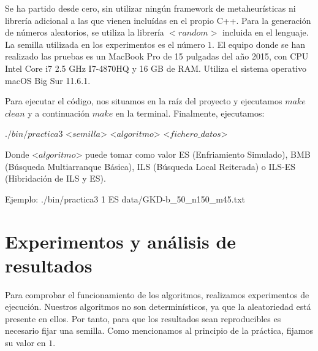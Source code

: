 
Se ha partido desde cero, sin utilizar ningún framework de metaheurísticas ni librería adicional a las que vienen incluídas en el propio C++. Para la generación de números aleatorios, se utiliza la librería $<random>$ incluida en el lenguaje. La semilla utilizada en los experimentos es el número $1$. El equipo donde se han realizado las pruebas es un MacBook Pro de 15 pulgadas del año 2015, con CPU Intel Core i7 2.5 GHz I7-4870HQ y 16 GB de RAM. Utiliza el sistema operativo macOS Big Sur 11.6.1.

Para ejecutar el código, nos situamos en la raíz del proyecto y ejecutamos $make$ $clean$ y a continuación $make$ en la terminal. Finalmente, ejecutamos:

\noindent $./bin/practica3$ <$semilla$> \space <$algoritmo$> \space <$fichero\_datos$>

\noindent Donde <$algoritmo$> \space puede tomar como valor ES (Enfriamiento Simulado), BMB (Búsqueda Multiarranque Básica), ILS (Búsqueda Local Reiterada) o ILS-ES (Hibridación de ILS y ES).

\noindent Ejemplo: ./bin/practica3 1 ES data/GKD-b\_50\_n150\_m45.txt


\part{Experimentos y análisis de resultados}
Para comprobar el funcionamiento de los algoritmos, realizamos experimentos de ejecución. Nuestros algoritmos no son determinísticos, ya que la aleatoriedad está presente en ellos. Por tanto, para que los resultados sean reproducibles es necesario fijar una semilla. Como mencionamos al principio de la práctica, fijamos su valor en $1$. 

